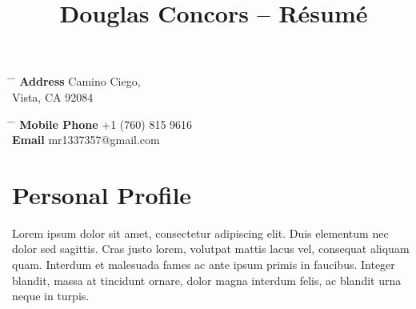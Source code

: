 \documentclass[10pt]{article} %
\begin{document}

\title{Douglas Concors -- Résumé} %


\parbox{0.5\textwidth}{ %
\begin{tabbing} %
\hspace{3cm} \= \hspace{4cm} \= \kill %
{\bf Address}  Camino Ciego,\\ %
\> Vista, CA 92084 \\ %
\end{tabbing}}
\hfill %
\parbox{0.5\textwidth}{ %
\begin{tabbing} %
\hspace{3cm} \= \hspace{4cm} \= \kill %
{\bf Mobile Phone} \> +1 (760) 815 9616 \\ %
{\bf Email} \> mr1337357@gmail.com \\ %
\end{tabbing}}


\section{Personal Profile}

Lorem ipsum dolor sit amet, consectetur adipiscing elit. Duis elementum nec dolor sed sagittis. Cras justo lorem, volutpat mattis lacus vel, consequat aliquam quam. Interdum et malesuada fames ac ante ipsum primis in faucibus. Integer blandit, massa at tincidunt ornare, dolor magna interdum felis, ac blandit urna neque in turpis.
\end{document}
